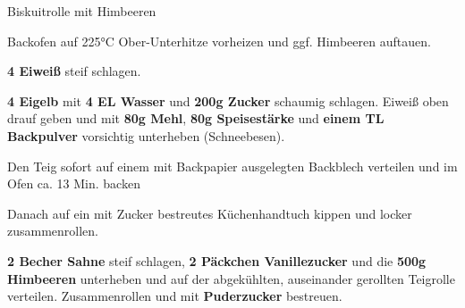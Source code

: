 \begin{recipe}[]{Biskuitrolle mit Himbeeren} %

\step
Backofen auf 225°C Ober-Unterhitze vorheizen und ggf. Himbeeren auftauen.

\step
\textbf{4 Eiweiß} steif schlagen.

\step
\textbf{4 Eigelb} mit \textbf{4 EL Wasser} und \textbf{200g Zucker} schaumig schlagen. Eiweiß oben drauf geben und mit \textbf{80g Mehl}, \textbf{80g Speisestärke} und \textbf{einem TL Backpulver} vorsichtig unterheben (Schneebesen).

\step
Den Teig sofort auf einem mit Backpapier ausgelegten Backblech verteilen und im Ofen ca. 13 Min. backen

\step
Danach auf ein mit Zucker bestreutes Küchenhandtuch kippen und locker zusammenrollen.

\step
\textbf{2 Becher Sahne} steif schlagen, \textbf{2 Päckchen Vanillezucker} und die \textbf{500g Himbeeren} unterheben und auf der abgekühlten, auseinander gerollten  Teigrolle verteilen. Zusammenrollen und mit \textbf{Puderzucker} bestreuen.

\end{recipe}